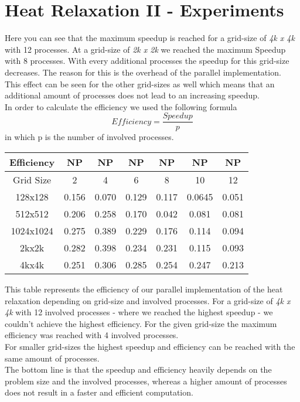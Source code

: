 \documentclass{article}
\newcommand{\enterProblemHeader}[1]{
}
\newcommand{\exitProblemHeader}[1]{
}
\newcounter{homeworkProblemCounter} %
\newcommand{\homeworkProblemName}{}
\newenvironment{homeworkProblem}[1][Problem \arabic{homeworkProblemCounter}]{ %
\stepcounter{homeworkProblemCounter} %
\renewcommand{\homeworkProblemName}{#1} %
\section{\homeworkProblemName} %
}{
}
\begin{document}
\begin{homeworkProblem}[Heat Relaxation II - Experiments]
\begin{center}
\end{center}
Here you can see that the maximum speedup is reached for a grid-size of \textit{4k x 4k} with 12 processes. At a grid-size of \textit{2k x 2k} we reached the maximum Speedup with 8 processes. With every additional processes the speedup for this grid-size decreases. The reason for this is the overhead of the parallel implementation. \\ 
This effect can be seen for the other grid-sizes as well which means that an additional amount of processes does not lead to an increasing speedup. \\
In order to calculate the efficiency we used the following formula
$$Efficiency = \frac{Speedup}{p}$$
in which p is the number of involved processes.\\
\begin{center}
\begin{tabular}{ |c|c|c|c|c|c|c| }
\hline 
\textbf{Efficiency} & NP & NP & NP & NP & NP & NP\\
\hline
Grid Size & 2 & 4 & 6 & 8 & 10 & 12 \\
\hline
128x128 & 0.156 & 0.070 & 0.129 & 0.117 & 0.0645 & 0.051 \\ 
\hline
512x512 & 0.206 & 0.258 & 0.170 & 0.042 & 0.081 & 0.081 \\ 
\hline
1024x1024 & 0.275 & 0.389 & 0.229 & 0.176 & 0.114 & 0.094 \\ 
\hline
2kx2k & 0.282 & 0.398 & 0.234 & 0.231 & 0.115 & 0.093 \\
\hline
4kx4k & 0.251 & 0.306 & 0.285 & 0.254 & 0.247 & 0.213 \\
\hline
\end{tabular}
\end{center}
This table represents the efficiency of our parallel implementation of the heat relaxation depending on grid-size and involved processes. For a grid-size of \textit{4k x 4k} with 12 involved processes - where we reached the highest speedup - we couldn't achieve the highest efficiency. For the given grid-size the maximum efficiency was reached with 4 involved processes. \\
For smaller grid-sizes the highest speedup and efficiency can be reached with the same amount of processes. \\ 
The bottom line is that the speedup and efficiency heavily depends on the problem size and the involved processes, whereas a higher amount of processes does not result in a faster and efficient computation. \\ \\ 
\begin{center}
\end{center}

\end{homeworkProblem}
\clearpage
\end{document}
